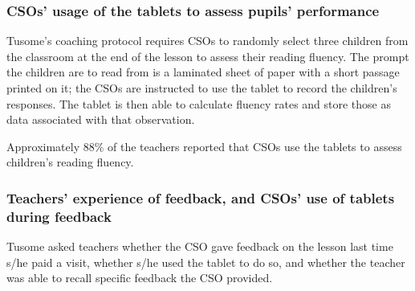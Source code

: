 \documentclass[11pt]{article}
\begin{document}
    \hypertarget{csos-usage-of-the-tablets-to-assess-pupils-performance}{%
\subsubsection{CSOs' usage of the tablets to assess pupils'
performance}\label{csos-usage-of-the-tablets-to-assess-pupils-performance}}

Tusome's coaching protocol requires CSOs to randomly select three
children from the classroom at the end of the lesson to assess their
reading fluency. The prompt the children are to read from is a laminated
sheet of paper with a short passage printed on it; the CSOs are
instructed to use the tablet to record the children's responses. The
tablet is then able to calculate fluency rates and store those as data
associated with that observation.

Approximately 88\% of the teachers reported that CSOs use the tablets to
assess children's reading fluency.

    \hypertarget{teachers-experience-of-feedback-and-csos-use-of-tablets-during-feedback}{%
\subsubsection{Teachers' experience of feedback, and CSOs' use of
tablets during
feedback}\label{teachers-experience-of-feedback-and-csos-use-of-tablets-during-feedback}}

Tusome asked teachers whether the CSO gave feedback on the lesson last
time s/he paid a visit, whether s/he used the tablet to do so, and
whether the teacher was able to recall specific feedback the CSO
provided.
\end{document}
